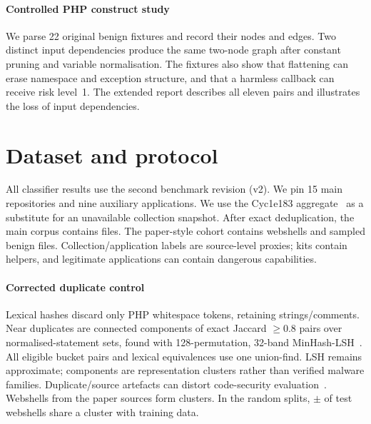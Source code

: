 \paragraph{Controlled PHP construct study}
We parse 22 original benign fixtures and record their nodes and edges. Two distinct input dependencies
produce the same two-node graph after constant pruning and variable normalisation. The fixtures also show
that flattening can erase namespace and exception structure, and that a harmless callback can receive risk
level~1. The extended report describes all eleven pairs and illustrates the loss of input dependencies.

\section{Dataset and protocol}\label{sec:dataset}
All classifier results use the second benchmark revision (v2). We pin 15 main repositories and nine
auxiliary applications. We use the Cyc1e183 aggregate~\cite{cyc1e183} as a substitute for an unavailable
collection snapshot. After exact deduplication, the main corpus contains  files.
The paper-style cohort contains  webshells and
 sampled benign files. Collection/application labels are source-level proxies;
kits contain helpers, and legitimate applications can contain dangerous capabilities.

\paragraph{Corrected duplicate control}
Lexical hashes discard only PHP whitespace tokens, retaining strings/comments. Near duplicates are connected
components of exact Jaccard $\geq0.8$ pairs over normalised-statement sets, found with 128-permutation,
32-band MinHash-LSH~\cite{broder1997minhash}. All eligible bucket pairs and lexical equivalences use one union-find.
LSH remains approximate; components are representation clusters rather than verified malware families. Duplicate/source artefacts can distort code-security evaluation~\cite{allamanis2019duplication,arp2022dos}.
Webshells from the paper sources form  clusters. In the random splits,
 $\pm$  of test webshells share a cluster with training data.

